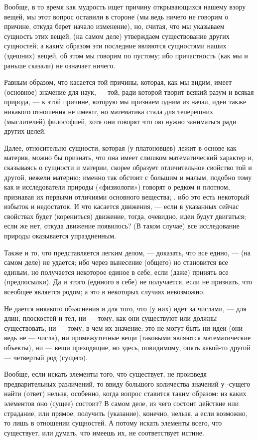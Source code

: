 \documentclass{article}
\begin{document}
Вообще, в то время как мудрость ищет причину открывающихся нашему взору вещей, мы  этот вопрос оставили в стороне (мы ведь ничего не говорим о причине, откуда берет начало изменение), но, считая, что мы указываем сущность этих вещей, (на самом деле) утверждаем существование других сущностей; а каким образом эти последние являются сущностями наших (здешних) вещей, об этом мы говорим по пустому; ибо причастность (как мы и раньше сказали) не означает ничего.

Равным образом, что касается той причины, которая, как мы видим, имеет (основное) значение для наук, — той, ради которой творит всякий разум и всякая природа, — к этой причине, которую мы признаем одним из начал, идеи также никакого отношения не имеют, но математика стала для теперешних (мыслителей) философией, хотя они говорят что ою нужно заниматься ради других целей.

Далее, относительно сущности, которая (у платоновцев) лежит в основе как материя, можно бы признать, что она имеет слишком математический характер и, сказываясь о сущности и материи, скорее образует отличительное свойство той и другой, нежели материю; именно так обстоит с большим и малым, подобно тому как и исследователи природы («физиологи») говорят о редком и плотном, признавая их первыми отличиями основного вещества; . ибо это есть некоторый избыток и недостаток.
\footnotemark[34]
И что касается движения, — если в указанных сейчас свойствах будет (корениться) движение,
\footnotemark[35]
тогда, очевидно, идеи будут двигаться; если же нет, откуда движение появилось? (В таком случае) все исследование природы оказывается упраздненным.
\footnotemark[36]


Также и то, что представляется легким делом, — доказать, что все едино, — (на самом деле) не удается; ибо через вынесение (общего) но становится все единым, но получается некоторое единое в себе, если (даже) принять все (предпосылки).
\footnotemark[37]
Да и этого (единого в себе) не получается, если не признать, что всеобщее является родом;
\footnotemark[38]
а это в некоторых случаях невозможно.

Не дается никакого объяснения и для того, что (у них) идет за числами, — для длин, плоскостей и тел, ни — тому, как они существуют или должны существовать, ни — тому, в чем их значение; это не могут быть ни идеи (они ведь не — числа), ни промежуточные вещи (таковыми являются математические объекты), ни — вещи преходящие, но здесь, повидимому, опять какой-то другой — четвертый род (сущего).

Вообще, если искать элементы того, что существует, не произведя предварительных различений, то ввиду большого количества значений у -сущего найти (ответ) нельзя, особенно, когда вопрос ставится таким образом: из каких элементов оно (сущее) состоит? В самом деле, из чего состоит действие или страдание, или прямое, получить (указание), конечно, нельзя, а если возможно, то лишь в отношении сущностей.  А потому искать элементы всего, что существует, или думать, что имеешь их, не соответствует истине.
\end{document}
